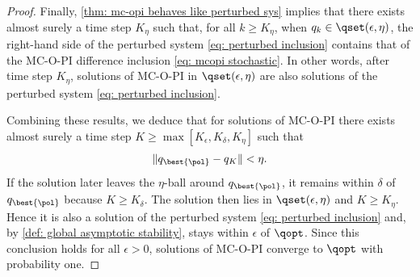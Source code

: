 \begin{proof}
Finally, \autoref{thm: mc-opi behaves like perturbed sys} implies that there exists almost surely a time step $K_\eta$ such that, for all $k \geq K_\eta$, when $q_k \in \qset(\epsilon, \eta)$, the right-hand side of the perturbed system \eqref{eq: perturbed inclusion} contains that of the MC-O-PI difference inclusion \eqref{eq: mcopi stochastic}. In other words, after time step $K_\eta$, solutions of MC-O-PI in $\qset(\epsilon,\eta)$ are also solutions of the perturbed system \eqref{eq: perturbed inclusion}.

Combining these results, we deduce that for solutions of MC-O-PI
there exists almost surely a time step $K \geq \max[K_\epsilon, K_\delta, K_\eta]$ such that
\begin{align}
    \| q_{\best{\pol}} - q_{K} \| < \eta .
\end{align}
If the solution later leaves the $\eta$-ball around $q_{\best{\pol}}$,
it remains within $\delta$ of $q_{\best{\pol}}$ because $K \geq K_\delta$.
The solution then lies in $\qset(\epsilon, \eta)$ and $K \geq K_\eta$. 
Hence it is also a solution of the perturbed system \eqref{eq: perturbed inclusion} and, by \autoref{def: global asymptotic stability}, stays within $\epsilon$ of $\qopt$.
Since this conclusion holds for all $\epsilon>0$, solutions of MC-O-PI converge to $\qopt$ with probability one.
\end{proof}


